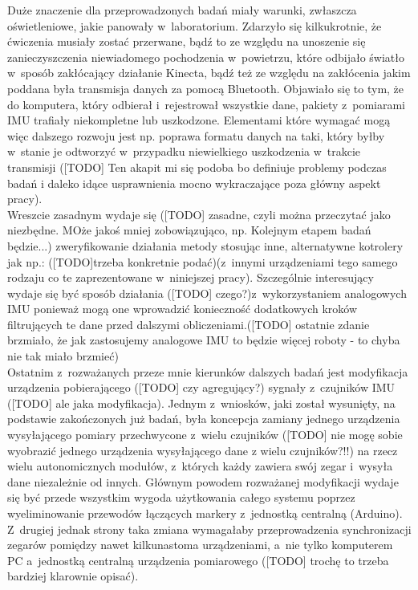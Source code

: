 Duże znaczenie dla przeprowadzonych badań miały warunki, zwłaszcza oświetleniowe, jakie panowały w~laboratorium. Zdarzyło się kilkukrotnie, że ćwiczenia musiały zostać przerwane, bądź to ze względu na unoszenie się zanieczyszczenia niewiadomego pochodzenia w~powietrzu, które odbijało światło w~sposób zakłócający działanie Kinecta, bądź też ze względu na zakłócenia jakim poddana była transmisja danych za pomocą Bluetooth. Objawiało się to tym, że do komputera, który odbierał i~rejestrował wszystkie dane, pakiety z~pomiarami IMU trafiały niekompletne lub uszkodzone. Elementami które wymagać mogą więc dalszego rozwoju jest np. poprawa formatu danych na taki, który byłby w~stanie je odtworzyć w~przypadku niewielkiego uszkodzenia w~trakcie transmisji ([TODO] Ten akapit mi się podoba bo definiuje problemy podczas badań i daleko idące usprawnienia mocno wykraczające poza główny aspekt pracy).\\

Wreszcie zasadnym wydaje się ([TODO] zasadne, czyli można przeczytać jako niezbędne. MOże jakoś mniej zobowiązująco, np. Kolejnym etapem badań będzie...) zweryfikowanie działania metody stosując inne, alternatywne kotrolery jak np.: ([TODO]trzeba konkretnie podać)(z~innymi urządzeniami tego samego rodzaju co te zaprezentowane w~niniejszej pracy). Szczególnie interesujący wydaje się być sposób działania ([TODO] czego?)z~wykorzystaniem analogowych IMU ponieważ mogą one wprowadzić konieczność dodatkowych kroków filtrujących te dane przed dalszymi obliczeniami.([TODO] ostatnie zdanie brzmiało, że jak zastosujemy analogowe IMU to będzie więcej roboty - to chyba nie tak miało brzmieć)\\

Ostatnim z~rozważanych przeze mnie kierunków dalszych badań jest modyfikacja urządzenia pobierającego ([TODO] czy agregujący?)  sygnały z~czujników IMU ([TODO] ale jaka modyfikacja). Jednym z~wniosków, jaki został wysunięty, na podstawie zakończonych już badań, była koncepcja zamiany jednego urządzenia wysyłającego pomiary przechwycone z~wielu czujników ([TODO] nie mogę sobie wyobrazić jednego urządzenia wysyłającego dane z wielu czujników?!!) na rzecz wielu autonomicznych modułów, z~których każdy zawiera swój zegar i~wysyła dane niezależnie od innych. Głównym powodem rozważanej modyfikacji wydaje się być przede wszystkim wygoda użytkowania całego systemu poprzez wyeliminowanie przewodów łączących markery z~jednostką centralną (Arduino). Z~drugiej jednak strony taka zmiana wymagałaby przeprowadzenia synchronizacji zegarów pomiędzy nawet kilkunastoma urządzeniami, a~nie tylko komputerem PC a~jednostką centralną urządzenia pomiarowego ([TODO] trochę to trzeba bardziej klarownie opisać).